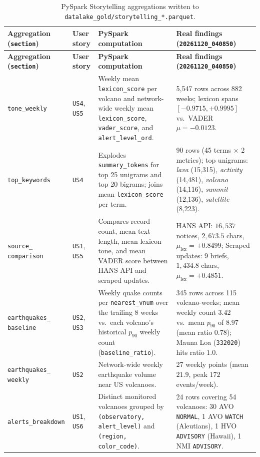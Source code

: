 \documentclass[11pt,a4paper]{article}
\begin{document}
\begin{longtable}{L{3.1cm}L{1.3cm}L{5.0cm}L{4.9cm}}
\caption{PySpark Storytelling aggregations written to \texttt{datalake\_gold/storytelling\_*.parquet}.}\label{tab:story_aggs}\\
\toprule
\textbf{Aggregation (\texttt{section})} & \textbf{User story} & \textbf{PySpark computation} & \textbf{Real findings (\texttt{20261120\_040850})}\\
\midrule
\endfirsthead
\toprule
\textbf{Aggregation (\texttt{section})} & \textbf{User story} & \textbf{PySpark computation} & \textbf{Real findings (\texttt{20261120\_040850})}\\
\midrule
\endhead
\texttt{tone\_weekly} & \texttt{US4}, \texttt{US5} & Weekly mean \texttt{lexicon\_score} per volcano and network-wide weekly mean \texttt{lexicon\_score}, \texttt{vader\_score}, and \texttt{alert\_level\_ord}. & 5,547 rows across 882 weeks; lexicon spans $[-0.9715, +0.9995]$ vs.\ VADER $\mu = -0.0123$.\\
\texttt{top\_keywords} & \texttt{US4} & Explodes \texttt{summary\_tokens} for top 25 unigrams and top 20 bigrams; joins mean \texttt{lexicon\_score} per term. & 90 rows (45 terms $\times$ 2 metrics); top unigrams: \emph{lava} (15,315), \emph{activity} (14,481), \emph{volcano} (14,116), \emph{summit} (12,136), \emph{satellite} (8,223).\\
\texttt{source\_ comparison} & \texttt{US1}, \texttt{US5} & Compares record count, mean text length, mean lexicon tone, and mean VADER score between HANS API and scraped updates. & HANS API: $16,537$ notices, $2,673.5$ chars, $\mu_{\text{lex}} = +0.8499$; Scraped updates: $9$ briefs, $1,434.8$ chars, $\mu_{\text{lex}} = +0.4851$.\\
\texttt{earthquakes\_ baseline} & \texttt{US2}, \texttt{US3} & Weekly quake counts per \texttt{nearest\_vnum} over the trailing 8 weeks vs.\ each volcano's historical $p_{90}$ weekly count (\texttt{baseline\_ratio}). & 345 rows across 115 volcano-weeks; mean weekly count $3.42$ vs.\ mean $p_{90}$ of $8.97$ (mean ratio $0.78$); Mauna Loa (\texttt{332020}) hits ratio $1.0$.\\
\texttt{earthquakes\_ weekly} & \texttt{US2} & Network-wide weekly earthquake volume near US volcanoes. & 27 weekly points (mean $21.9$, peak $172$ events/week).\\
\texttt{alerts\_breakdown} & \texttt{US1}, \texttt{US6} & Distinct monitored volcanoes grouped by \texttt{(observatory, alert\_level)} and \texttt{(region, color\_code)}. & 24 rows covering 54 volcanoes: 30 AVO \texttt{NORMAL}, 1 AVO \texttt{WATCH} (Aleutians), 1 HVO \texttt{ADVISORY} (Hawaii), 1 NMI \texttt{ADVISORY}.\\
\bottomrule
\end{longtable}
\end{document}
